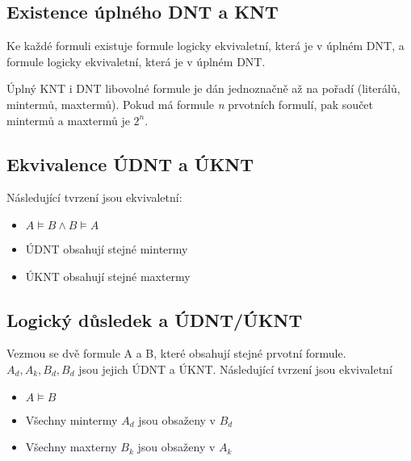 \documentclass{szzclass}
\begin{document}
\subsection{Existence úplného DNT a KNT}
Ke každé formuli existuje formule logicky ekvivaletní, která je v úplném DNT, a formule logicky ekvivaletní, která je v úplném DNT.

Úplný KNT i DNT libovolné formule je dán jednoznačně až na pořadí (literálů, mintermů, maxtermů). Pokud má formule \textit{n} prvotních
formulí, pak součet mintermů a maxtermů je $2^n$.
\subsection{Ekvivalence ÚDNT a ÚKNT}
Následující tvrzení jsou ekvivaletní:
\begin{itemize}
	\item $A \models B \wedge B \models A$
	\item ÚDNT obsahují stejné mintermy
	\item ÚKNT obsahují stejné maxtermy
\end{itemize}
\subsection{Logický důsledek a ÚDNT/ÚKNT}
Vezmou se dvě formule A a B, které obsahují stejné prvotní formule. $A_d, A_k, B_d, B_d$ jsou jejich ÚDNT a ÚKNT.
Následující tvrzení jsou ekvivaletní
\begin{itemize}
	\item $A \models B$
	\item Všechny mintermy $A_d$ jsou obsaženy v $B_d$
	\item Všechny maxterny $B_k$ jsou obsaženy v $A_k$
\end{itemize}
\end{document}
